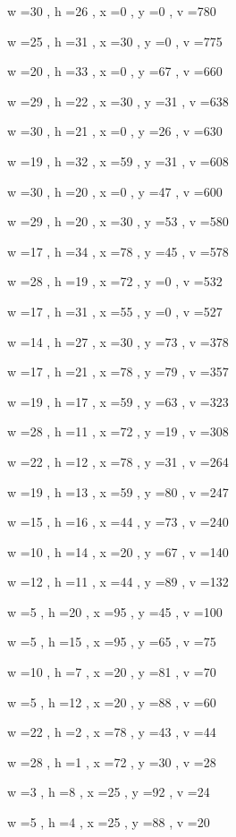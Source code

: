 \documentclass[11pt]{article}
\begin{document}
w =30 , h =26 , x =0 , y =0 , v =780
\par
w =25 , h =31 , x =30 , y =0 , v =775
\par
w =20 , h =33 , x =0 , y =67 , v =660
\par
w =29 , h =22 , x =30 , y =31 , v =638
\par
w =30 , h =21 , x =0 , y =26 , v =630
\par
w =19 , h =32 , x =59 , y =31 , v =608
\par
w =30 , h =20 , x =0 , y =47 , v =600
\par
w =29 , h =20 , x =30 , y =53 , v =580
\par
w =17 , h =34 , x =78 , y =45 , v =578
\par
w =28 , h =19 , x =72 , y =0 , v =532
\par
w =17 , h =31 , x =55 , y =0 , v =527
\par
w =14 , h =27 , x =30 , y =73 , v =378
\par
w =17 , h =21 , x =78 , y =79 , v =357
\par
w =19 , h =17 , x =59 , y =63 , v =323
\par
w =28 , h =11 , x =72 , y =19 , v =308
\par
w =22 , h =12 , x =78 , y =31 , v =264
\par
w =19 , h =13 , x =59 , y =80 , v =247
\par
w =15 , h =16 , x =44 , y =73 , v =240
\par
w =10 , h =14 , x =20 , y =67 , v =140
\par
w =12 , h =11 , x =44 , y =89 , v =132
\par
w =5 , h =20 , x =95 , y =45 , v =100
\par
w =5 , h =15 , x =95 , y =65 , v =75
\par
w =10 , h =7 , x =20 , y =81 , v =70
\par
w =5 , h =12 , x =20 , y =88 , v =60
\par
w =22 , h =2 , x =78 , y =43 , v =44
\par
w =28 , h =1 , x =72 , y =30 , v =28
\par
w =3 , h =8 , x =25 , y =92 , v =24
\par
w =5 , h =4 , x =25 , y =88 , v =20
\par
\newpage
\end{document}
